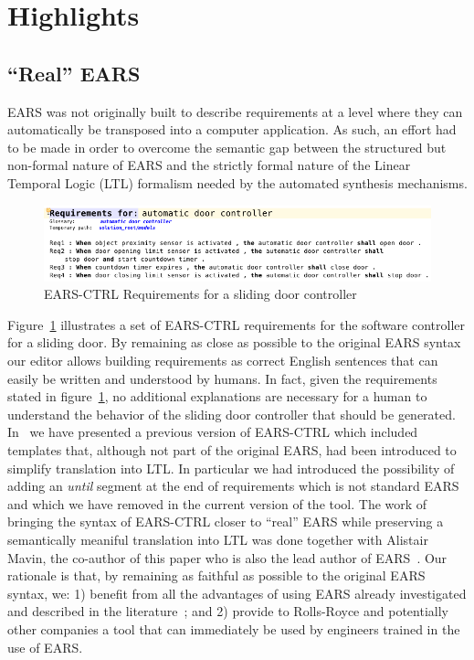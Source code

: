 \section{Highlights}
\vspace{-.2cm}
\subsection{``Real'' EARS}
\vspace{-.1cm}
EARS was not originally built to describe requirements at a level where they can
automatically be transposed into a computer application. As such, an effort had
to be made in order to overcome the semantic gap between the structured but
non-formal nature of EARS and the strictly formal nature of the Linear Temporal
Logic (LTL) formalism needed by the automated synthesis
mechanisms.\vspace{-.5cm} \begin{figure}[h!]
   \begin{center}
     \includegraphics[width=.9\textwidth]{images/EARS-Reqs.png}
     \vspace{-.3cm}
     \caption{\textsf{EARS-CTRL} Requirements for a sliding door
     controller}
     \label{fig:ears_reqs}
   \end{center} 
 \end{figure}
\vspace{-1cm}Figure~\ref{fig:ears_reqs} illustrates a set of \textsf{EARS-CTRL}
requirements for the software controller for a sliding door. By remaining as close as
possible to the original EARS syntax our editor allows building requirements as
correct English sentences that can easily be written and understood by humans.
In fact, given the requirements stated in figure~\ref{fig:ears_reqs}, no
additional explanations are necessary for a human to understand the behavior of
the sliding door controller that should be generated. In~\cite{LucioRCM17} we
have presented a previous version of \textsf{EARS-CTRL} which included templates
that, although not part of the original EARS, had been introduced to simplify
translation into LTL. In particular we had introduced the possibility of adding
an \emph{until} segment at the end of requirements which is not standard EARS
and which we have removed in the current version of the tool.
The work of bringing the syntax of \textsf{EARS-CTRL} closer to ``real'' EARS
while preserving a semantically meaniful translation into LTL was done together with Alistair Mavin, the
co-author of this paper who is also the lead author of EARS~\cite{EARS09}.
Our rationale is that, by remaining as faithful as possible to the original EARS
syntax, we: 1) benefit from all the advantages of using EARS already
investigated and described in the literature~\cite{EARS09,EARS16}; and 2)
provide to Rolls-Royce and potentially other companies a tool that can
immediately be used by engineers trained in the use of EARS.\vspace{-.5cm}

